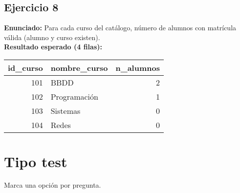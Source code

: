 \documentclass[11pt,a4paper]{article}
\begin{document}
\subsection*{Ejercicio 8}
\textbf{Enunciado:} Para cada curso del catálogo, número de alumnos con matrícula válida (alumno y curso existen).\\
\textbf{Resultado esperado (4 filas):}
\begin{center}
\begin{tabular}{r l r}
\toprule
id\_curso & nombre\_curso & n\_alumnos \\
\midrule
101 & BBDD         & 2 \\
102 & Programación & 1 \\
103 & Sistemas     & 0 \\
104 & Redes        & 0 \\
\bottomrule
\end{tabular}
\end{center}

\section{Tipo test}

Marca una opción por pregunta.
\end{document}

